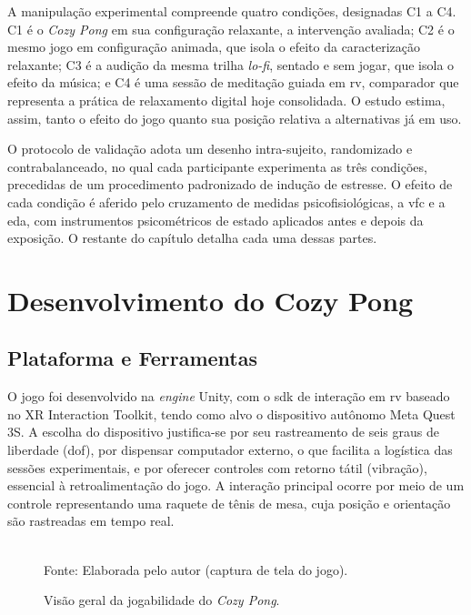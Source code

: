 A manipulação experimental compreende quatro condições, designadas C1 a C4. C1 é o \textit{Cozy Pong} em sua configuração relaxante, a intervenção avaliada; C2 é o mesmo jogo em configuração animada, que isola o efeito da caracterização relaxante; C3 é a audição da mesma trilha \textit{lo-fi}, sentado e sem jogar, que isola o efeito da música; e C4 é uma sessão de meditação guiada em \gls{rv}, comparador que representa a prática de relaxamento digital hoje consolidada. O estudo estima, assim, tanto o efeito do jogo quanto sua posição relativa a alternativas já em uso.

O protocolo de validação adota um desenho intra-sujeito, randomizado e contrabalanceado, no qual cada participante experimenta as três condições, precedidas de um procedimento padronizado de indução de estresse. O efeito de cada condição é aferido pelo cruzamento de medidas psicofisiológicas, a \gls{vfc} e a \gls{eda}, com instrumentos psicométricos de estado aplicados antes e depois da exposição. O restante do capítulo detalha cada uma dessas partes.

\section{Desenvolvimento do Cozy Pong}\label{sec:desenvolvimento}

\subsection{Plataforma e Ferramentas}\label{subsec:plataforma}

O jogo foi desenvolvido na \textit{engine} Unity, com o \gls{sdk} de interação em \gls{rv} baseado no XR Interaction Toolkit, tendo como alvo o dispositivo autônomo Meta Quest 3S. A escolha do dispositivo justifica-se por seu rastreamento de seis graus de liberdade (\gls{dof}), por dispensar computador externo, o que facilita a logística das sessões experimentais, e por oferecer controles com retorno tátil (vibração), essencial à retroalimentação do jogo. A interação principal ocorre por meio de um controle representando uma raquete de tênis de mesa, cuja posição e orientação são rastreadas em tempo real.

\begin{figure}[H]
    \centering
    \caption{Visão geral da jogabilidade do \textit{Cozy Pong}. }
    \label{fig:gameplay}
    \\[2pt]
    {\footnotesize Fonte: Elaborada pelo autor (captura de tela do jogo).}
\end{figure}

